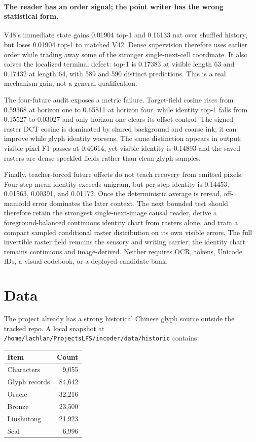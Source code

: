 \documentclass[11pt]{article}
\begin{document}
\paragraph{The reader has an order signal; the point writer has the wrong
statistical form.}
V48's immediate state gains 0.01904 top-1 and 0.16133 nat over shuffled
history, but loses 0.01904 top-1 to matched V42. Dense supervision therefore
uses earlier order while trading away some of the stronger single-next-cell
coordinate. It also solves the localized terminal defect: top-1 is 0.17383 at
visible length 63 and 0.17432 at length 64, with 589 and 590 distinct
predictions. This is a real mechanism gain, not a general qualification.

The four-future audit exposes a metric failure. Target-field cosine rises from
0.59368 at horizon one to 0.65811 at horizon four, while identity top-1 falls
from 0.15527 to 0.03027 and only horizon one clears its offset control. The
signed-raster DCT cosine is dominated by shared background and coarse ink; it
can improve while glyph identity worsens. The same distinction appears in
output: visible pixel F1 passes at 0.46614, yet visible identity is 0.14893 and
the saved rasters are dense speckled fields rather than clean glyph samples.

Finally, teacher-forced future offsets do not teach recovery from emitted
pixels. Four-step mean identity exceeds unigram, but per-step identity is
0.14453, 0.01563, 0.00391, and 0.01172. Once the deterministic average is
reread, off-manifold error dominates the later context. The next bounded test
should therefore retain the strongest single-next-image causal reader, derive
a foreground-balanced continuous identity chart from rasters alone, and train
a compact sampled conditional raster distribution on its own visible errors.
The full invertible raster field remains the sensory and writing carrier; the
identity chart remains continuous and image-derived. Neither requires OCR,
tokens, Unicode IDs, a visual codebook, or a deployed candidate bank.

\clearpage
\section{Data}

The project already has a strong historical Chinese glyph source outside the tracked repo. A local snapshot at \texttt{/home/lachlan/ProjectsLFS/incoder/data/historic} contains:
\begin{center}
\begin{tabular}{lr}
\toprule
Item & Count \\
\midrule
Characters & 9,055 \\
Glyph records & 84,642 \\
Oracle & 32,216 \\
Bronze & 23,500 \\
Liushutong & 21,923 \\
Seal & 6,996 \\
\bottomrule
\end{tabular}
\end{center}
\end{document}

